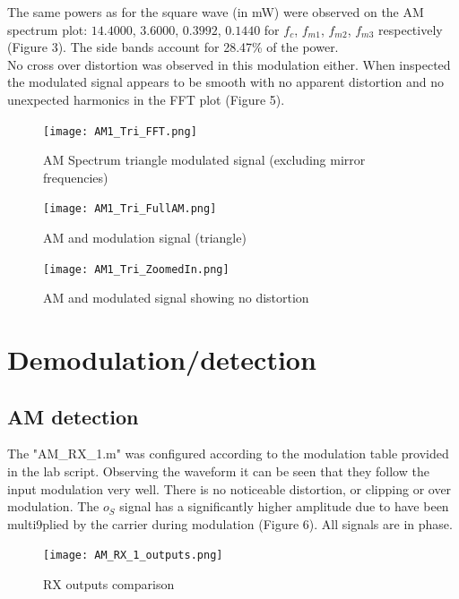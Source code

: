 \documentclass[a4paper]{article}
\begin{document}
\noindent The same powers as for the square wave (in mW) were observed on the AM spectrum plot: $14.4000$, $3.6000$, $0.3992$, $0.1440$ for $f_c$, $f_{m1}$, $f_{m2}$, $f_{m3}$ respectively (Figure 3). The side bands account for 28.47\% of the power. \\

\noindent No cross over distortion was observed in this modulation either. When inspected the modulated signal appears to be smooth with no apparent distortion and no unexpected harmonics in the FFT plot (Figure 5).

\begin{figure}[htbp]
\centering

\texttt{[image: AM1\_Tri\_FFT.png]}
\caption{AM Spectrum triangle modulated signal (excluding mirror frequencies)}

\end{figure}

\begin{figure}[htbp]
\centering

\texttt{[image: AM1\_Tri\_FullAM.png]}
\caption{AM and modulation signal (triangle)}

\end{figure}

\begin{figure}[htbp]
\centering
\texttt{[image: AM1\_Tri\_ZoomedIn.png]}
\caption{AM and modulated signal showing no distortion}

\end{figure}


\section{Demodulation/detection}

\subsection{AM detection}
The "AM\_RX\_1.m" was configured according to the modulation table provided in the lab script. Observing the waveform it can be seen that they follow the input modulation very well. There is no noticeable distortion, or clipping or over modulation. The $o_S$ signal has a significantly higher amplitude due to have been multi9plied by the carrier during modulation (Figure 6). All signals are in phase.

\begin{figure}[htbp]
\centering

\texttt{[image: AM\_RX\_1\_outputs.png]}
\caption{RX outputs comparison}

\end{figure}
\end{document}

